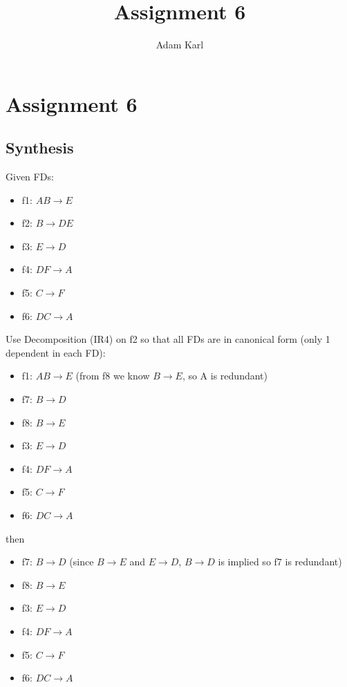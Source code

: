 \documentclass[a4paper]{article}
\title{Assignment 6}
\author{Adam Karl}
\begin{document}
\maketitle

\section{Assignment 6}
\subsection{Synthesis}

Given FDs:

\begin{itemize}
    \item f1: $AB \rightarrow E$
    \item f2: $B \rightarrow DE$
    \item f3: $E \rightarrow D$
    \item f4: $DF \rightarrow A$
    \item f5: $C \rightarrow F$
    \item f6: $DC \rightarrow A$
\end{itemize}

Use Decomposition (IR4) on f2 so that all FDs are in canonical form (only 1 dependent in each FD):

\begin{itemize}
    \item f1: \sout{$AB \rightarrow E$} (from f8 we know $B \rightarrow E$, so A is redundant)
    \item f7: $B \rightarrow D$
    \item f8: $B \rightarrow E$
    \item f3: $E \rightarrow D$
    \item f4: $DF \rightarrow A$
    \item f5: $C \rightarrow F$
    \item f6: $DC \rightarrow A$
\end{itemize}

then

\begin{itemize}
    \item f7: \sout{$B \rightarrow D$} (since $B \rightarrow E$ and $E \rightarrow D$, $B \rightarrow D$ is implied so f7 is redundant)
    \item f8: $B \rightarrow E$
    \item f3: $E \rightarrow D$
    \item f4: $DF \rightarrow A$
    \item f5: $C \rightarrow F$
    \item f6: $DC \rightarrow A$
\end{itemize}
\end{document}
